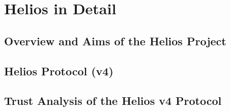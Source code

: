 
\chapter{Helios in Detail}
\label{ch:helios}

\section{Overview and Aims of the Helios Project}
\label{ch:helios:aims}



\section{Helios Protocol (v4)}
\label{ch:helios:v4}


\section{Trust Analysis of the Helios v4 Protocol}
\label{ch:helios:trust}

